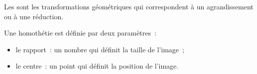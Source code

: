 Les  sont les transformations géométriques qui
correspondent à un agrandissement ou à une réduction.\smallskip

\noindent Une homothétie est définie par deux paramètres~:
\begin{itemize}
    \item le rapport~: un nombre qui définit la taille de l'image~;
    \item le centre~: un point qui définit la position de l'image.
\end{itemize}